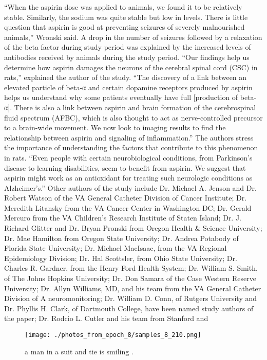 \documentclass{article}%
\begin{document}
“When the aspirin dose was applied to animals, we found it to be relatively stable. Similarly, the sodium was quite stable but low in levels. There is little question that aspirin is good at preventing seizures of severely malnourished animals,” Wronski said.\newline%
A drop in the number of seizures followed by a relaxation of the beta factor during study period was explained by the increased levels of antibodies received by animals during the study period.\newline%
“Our findings help us determine how aspirin damages the neurons of the cerebral spinal cord (CSC) in rats,” explained the author of the study. “The discovery of a link between an elevated particle of beta{-}α and certain dopamine receptors produced by aspirin helps us understand why some patients eventually have full {[}production of beta{-}α{]}. There is also a link between aspirin and brain formation of the cerebrospinal fluid spectrum (AFBC), which is also thought to act as nerve{-}controlled precursor to a brain{-}wide movement. We now look to imaging results to find the relationship between aspirin and signaling of inflammation.”\newline%
The authors stress the importance of understanding the factors that contribute to this phenomenon in rats. “Even people with certain neurobiological conditions, from Parkinson’s disease to learning disabilities, seem to benefit from aspirin. We suggest that aspirin might work as an antioxidant for treating such neurologic conditions as Alzheimer’s.”\newline%
Other authors of the study include Dr. Michael A. Jenson and Dr. Robert Watson of the VA General Catheter Division of Cancer Institute; Dr. Meredith Litansky from the VA Cancer Center in Washington DC; Dr. Gerald Mercuro from the VA Children’s Research Institute of Staten Island; Dr. J. Richard Glitter and Dr. Bryan Pronski from Oregon Health \& Science University; Dr. Mae Hamilton from Oregon State University; Dr. Andrea Potabody of Florida State University; Dr. Michael MacIsaac, from the VA Regional Epidemiology Division; Dr. Hal Scottsler, from Ohio State University; Dr. Charles R. Gardner, from the Henry Ford Health System; Dr. William S. Smith, of The Johns Hopkins University; Dr. Don Samara of the Case Western Reserve University; Dr. Allyn Williams, MD, and his team from the VA General Catheter Division of A neuromonitoring; Dr. William D. Conn, of Rutgers University and Dr. Phyllis H. Clark, of Dartmouth College, have been named study authors of the paper; Dr. Rodcio L. Cutler and his team from Stanford and

%


\begin{figure}[h!]%
\centering%
\texttt{[image: ./photos\_from\_epoch\_8/samples\_8\_210.png]}%
\caption{a man in a suit and tie is smiling .}%
\end{figure}

%
\end{document}
